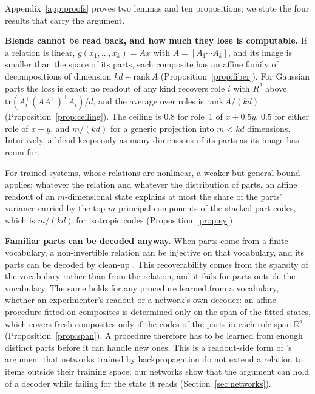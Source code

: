 \documentclass[10pt]{article}
\theoremstyle{plain}
\theoremstyle{remark}
\newcommand{\R}{\mathbb{R}}
\begin{document}
Appendix~\ref{app:proofs} proves two lemmas and ten propositions; we state the four results that carry the argument.

\textbf{Blends cannot be read back, and how much they lose is computable.} If a relation is linear, $g(x_1, \ldots, x_k) = A x$ with $A = [A_1 \cdots A_k]$, and its image is smaller than the space of its parts, each composite has an affine family of decompositions of dimension $kd - \mathrm{rank}\,A$ (Proposition~\ref{prop:fiber}). For Gaussian parts the loss is exact: no readout of any kind recovers role $i$ with $R^2$ above $\mathrm{tr}(A_i^{\top}(AA^{\top})^{+}A_i)/d$, and the average over roles is $\mathrm{rank}\,A/(kd)$ (Proposition~\ref{prop:ceiling}). The ceiling is $0.8$ for role~1 of $x + 0.5y$, $0.5$ for either role of $x + y$, and $m/(kd)$ for a generic projection into $m < kd$ dimensions. Intuitively, a blend keeps only as many dimensions of its parts as its image has room for.

For trained systems, whose relations are nonlinear, a weaker but general bound applies: whatever the relation and whatever the distribution of parts, an affine readout of an $m$-dimensional state explains at most the share of the parts' variance carried by the top $m$ principal components of the stacked part codes, which is $m/(kd)$ for isotropic codes (Proposition~\ref{prop:ey}).

\textbf{Familiar parts can be decoded anyway.} When parts come from a finite vocabulary, a non-invertible relation can be injective on that vocabulary, and its parts can be decoded by clean-up \citep{plate1995,plate2003,frady2018}. This recoverability comes from the sparsity of the vocabulary rather than from the relation, and it fails for parts outside the vocabulary. The same holds for any procedure learned from a vocabulary, whether an experimenter's readout or a network's own decoder: an affine procedure fitted on composites is determined only on the span of the fitted states, which covers fresh composites only if the codes of the parts in each role span $\R^d$ (Proposition~\ref{prop:span}). A procedure therefore has to be learned from enough distinct parts before it can handle new ones. This is a readout-side form of \citet{marcus1998}'s argument that networks trained by backpropagation do not extend a relation to items outside their training space; our networks show that the argument can hold of a decoder while failing for the state it reads (Section~\ref{sec:networks}).
\end{document}
